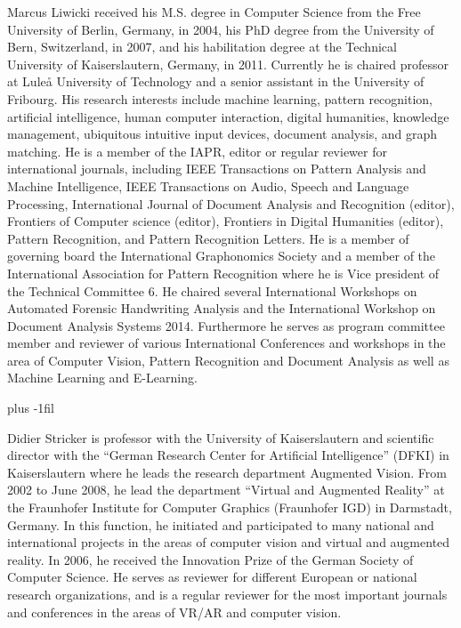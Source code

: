 \documentclass{ieeeaccess}
\begin{document}
\begin{IEEEbiography}{Marcus Liwicki} received his M.S. degree in Computer Science from the Free University of Berlin, Germany, in 2004, his PhD degree from the University of Bern, Switzerland, in 2007, and his habilitation degree at the Technical University of Kaiserslautern, Germany, in 2011. Currently he is chaired professor at Luleå University of Technology and a senior assistant in the University of Fribourg. His research interests include machine learning, pattern recognition, artificial intelligence, human computer interaction, digital humanities, knowledge management, ubiquitous intuitive input devices, document analysis, and graph matching. He is a member of the IAPR, editor or regular reviewer for international journals, including IEEE Transactions on Pattern Analysis and Machine Intelligence, IEEE Transactions on Audio, Speech and Language Processing, International Journal of Document Analysis and Recognition (editor), Frontiers of Computer science (editor), Frontiers in Digital Humanities (editor), Pattern Recognition, and Pattern Recognition Letters. He is a member of governing board the International Graphonomics Society and a member of the International Association for Pattern Recognition where he is Vice president of the Technical Committee 6. He chaired several International Workshops on Automated Forensic Handwriting Analysis and the International Workshop on Document Analysis Systems 2014. Furthermore he serves as program committee member and reviewer of various International Conferences and workshops in the area of Computer Vision, Pattern Recognition and Document Analysis as well as Machine Learning and E-Learning.
\end{IEEEbiography}
\vskip 0pt plus -1fil
\begin{IEEEbiography}{Didier Stricker} is professor with the University of Kaiserslautern and scientific director with the “German Research Center for Artificial Intelligence” (DFKI) in Kaiserslautern where he leads the research department Augmented Vision. From 2002 to June 2008, he lead the department “Virtual and Augmented Reality” at the Fraunhofer Institute for Computer Graphics (Fraunhofer IGD) in Darmstadt, Germany. In this function, he initiated and participated to many national and international projects in the areas of computer vision and virtual and augmented reality. In 2006, he received the Innovation Prize of the German Society of Computer Science. He serves as reviewer for different European or national research organizations, and is a regular reviewer for the most important journals and conferences in the areas of VR/AR and computer vision.
\end{IEEEbiography}
\end{document}
